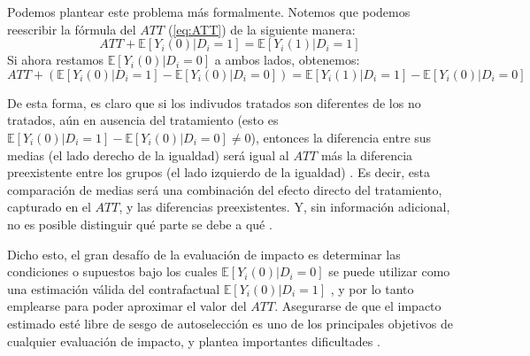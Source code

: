 \documentclass[../../main.tex]{subfiles}
\begin{document}
Podemos plantear este problema más formalmente. Notemos que podemos reescribir la fórmula
del \(ATT\) (\ref{eq:ATT}) de la siguiente manera:
\begin{equation}
    ATT + \mathbb{E} \left[Y_i(0)|D_i=1\right] = \mathbb{E} \left[Y_i(1)|D_i=1\right]
    \label{eq:ATT2}
\end{equation}
Si ahora restamos \(\mathbb{E} \left[Y_i(0)|D_i=0\right]\) a ambos lados, obtenemos:
\begin{equation}
    ATT + \left( \mathbb{E} \left[Y_i(0)|D_i=1\right] - \mathbb{E} \left[Y_i(0)|D_i=0\right] \right) =
    \mathbb{E} \left[Y_i(1)|D_i=1\right] - \mathbb{E} \left[Y_i(0)|D_i=0\right]\
    \label{eq:ATT3}
\end{equation}

De esta forma, es claro que si los indivudos tratados son diferentes de los no tratados,
aún en ausencia del tratamiento (esto es \(\mathbb{E} \left[Y_i(0)|D_i=1\right] -
\mathbb{E} \left[Y_i(0)|D_i=0\right] \neq 0\)), entonces la diferencia entre sus medias
(el lado derecho de la igualdad) será igual al \(ATT\) más la diferencia preexistente
entre los grupos (el lado izquierdo de la igualdad) \cite{bernal}. Es decir, esta
comparación de medias será una combinación del efecto directo del tratamiento, capturado
en el \(ATT\), y las diferencias preexistentes. Y, sin información adicional, no es posible
distinguir qué parte se debe a qué \cite{bernal}.

Dicho esto, el gran desafío de la evaluación de impacto es determinar las condiciones o
supuestos bajo los cuales \(\mathbb{E} \left[Y_i(0)|D_i=0\right]\) se puede utilizar como
una estimación válida del contrafactual \(\mathbb{E} \left[Y_i(0)|D_i=1\right]\)
\cite{bernal}, y por lo tanto emplearse para poder aproximar el valor del \(ATT\).
Asegurarse de que el impacto estimado esté libre de sesgo de autoselección es uno de los
principales objetivos de cualquier evaluación de impacto, y plantea importantes
dificultades \cite{gertler-2016}.
\end{document}
